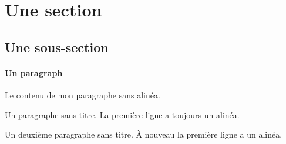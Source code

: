 \documentclass[a5paper,12pt]{scrartcl}
\begin{document}
\section{Une section}
\subsection{Une sous-section}
\paragraph{Un paragraph} Le contenu de mon paragraphe sans alinéa.

Un paragraphe sans titre. La première ligne a toujours un alinéa.

Un deuxième paragraphe sans titre. À nouveau la première ligne a un alinéa.
\end{document}
